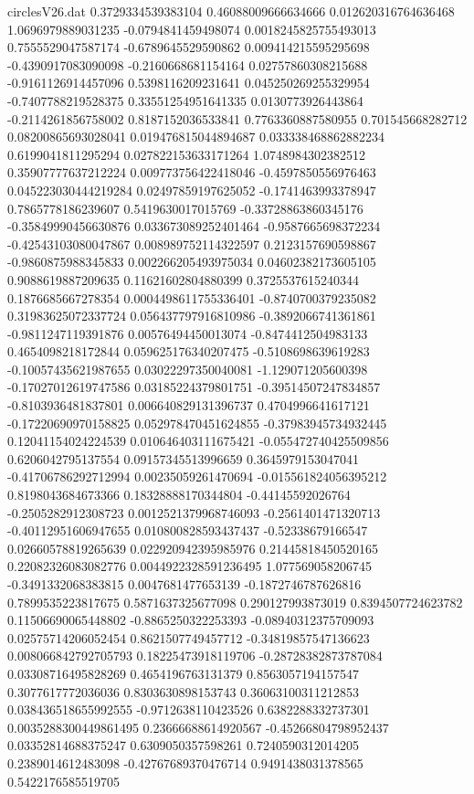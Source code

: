 \begin{filecontents}{circlesV26.dat}
0.3729334539383104	0.46088009666634666	0.012620316764636468
1.0696979889031235	-0.0794841459498074	0.0018245825755493013
0.7555529047587174	-0.6789645529590862	0.009414215595295698
-0.4390917083090098	-0.2160668681154164	0.02757860308215688
-0.9161126914457096	0.5398116209231641	0.045250269255329954
-0.7407788219528375	0.33551254951641335	0.0130773926443864
-0.2114261856758002	0.8187152036533841	0.7763360887580955
0.701545668282712	0.08200865693028041	0.019476815044894687
0.033338468862882234	0.6199041811295294	0.027822153633171264
1.0748984302382512	0.35907777637212224	0.009773756422418046
-0.4597850556976463	0.045223030444219284	0.02497859197625052
-0.1741463993378947	0.7865778186239607	0.5419630017015769
-0.33728863860345176	-0.35849990456630876	0.033673089252401464
-0.9587665698372234	-0.42543103080047867	0.008989752114322597
0.2123157690598867	-0.9860875988345833	0.002266205493975034
0.04602382173605105	0.9088619887209635	0.11621602804880399
0.3725537615240344	0.1876685667278354	0.0004498611755336401
-0.8740700379235082	0.31983625072337724	0.056437797916810986
-0.3892066741361861	-0.9811247119391876	0.00576494450013074
-0.8474412504983133	0.4654098218172844	0.059625176340207475
-0.5108698639619283	-0.10057435621987655	0.03022297350040081
-1.129071205600398	-0.17027012619747586	0.03185224379801751
-0.39514507247834857	-0.8103936481837801	0.006640829131396737
0.4704996641617121	-0.17220690970158825	0.052978470451624855
-0.37983945734932445	0.12041154024224539	0.010646403111675421
-0.055472740425509856	0.6206042795137554	0.09157345513996659
0.3645979153047041	-0.41706786292712994	0.00235059261470694
-0.015561824056395212	0.8198043684673366	0.18328888170344804
-0.44145592026764	-0.2505282912308723	0.0012521379968746093
-0.2561401471320713	-0.40112951606947655	0.010800828593437437
-0.52338679166547	0.02660578819265639	0.022920942395985976
0.21445818450520165	0.22082326083082776	0.0044922328591236495
1.077569058206745	-0.3491332068383815	0.0047681477653139
-0.1872746787626816	0.7899535223817675	0.5871637325677098
0.290127993873019	0.8394507724623782	0.11506690065448802
-0.8865250322253393	-0.08940312375709093	0.02575714206052454
0.8621507749457712	-0.34819857547136623	0.008066842792705793
0.18225473918119706	-0.28728382873787084	0.03308716495828269
0.4654196763131379	0.8563057194157547	0.3077617772036036
0.8303630898153743	0.36063100311212853	0.038436518655992555
-0.9712638110423526	0.6382288332737301	0.0035288300449861495
0.23666688614920567	-0.45266804798952437	0.03352814688375247
0.6309050357598261	0.7240590312014205	0.2389014612483098
-0.42767689370476714	0.9491438031378565	0.5422176585519705

\end{filecontents}
